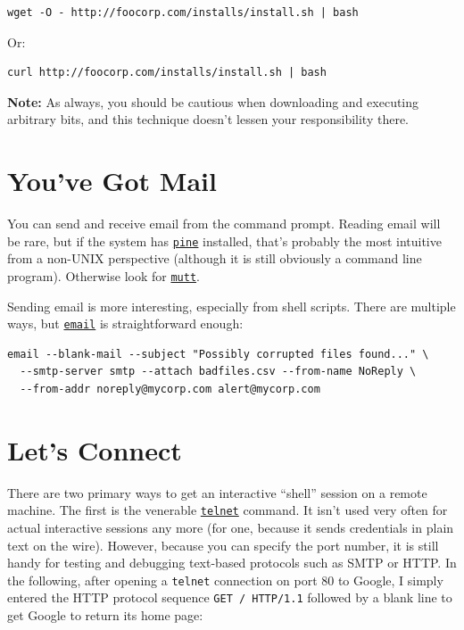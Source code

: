 \documentclass[10pt,]{book}
\numberwithin{figure}{chapter}
\begin{document}
\begin{verbatim}
wget -O - http://foocorp.com/installs/install.sh | bash
\end{verbatim}

Or:

\begin{verbatim}
curl http://foocorp.com/installs/install.sh | bash
\end{verbatim}

\textbf{Note:} As always, you should be cautious when downloading and
executing arbitrary bits, and this technique doesn't lessen your
responsibility there.

\section{You've Got Mail}\label{youve-got-mail}

You can send and receive email from the command prompt. Reading email
will be rare, but if the system has
\href{http://linux.die.net/man/1/pine}{\texttt{pine}} installed, that's
probably the most intuitive from a non-UNIX perspective (although it is
still obviously a command line program). Otherwise look for
\href{http://linux.die.net/man/1/mutt}{\texttt{mutt}}.

Sending email is more interesting, especially from shell scripts. There
are multiple ways, but
\href{http://linux.die.net/man/1/email}{\texttt{email}} is
straightforward enough:

\begin{verbatim}
email --blank-mail --subject "Possibly corrupted files found..." \
  --smtp-server smtp --attach badfiles.csv --from-name NoReply \
  --from-addr noreply@mycorp.com alert@mycorp.com
\end{verbatim}

\section{Let's Connect}\label{lets-connect}

There are two primary ways to get an interactive ``shell'' session on a
remote machine. The first is the venerable
\href{http://linux.die.net/man/1/telnet}{\texttt{telnet}} command. It
isn't used very often for actual interactive sessions any more (for one,
because it sends credentials in plain text on the wire). However,
because you can specify the port number, it is still handy for testing
and debugging text-based protocols such as SMTP or HTTP. In the
following, after opening a \texttt{telnet} connection on port 80 to
Google, I simply entered the HTTP protocol sequence
\texttt{GET / HTTP/1.1} followed by a blank line to get Google to return
its home page:
\end{document}
